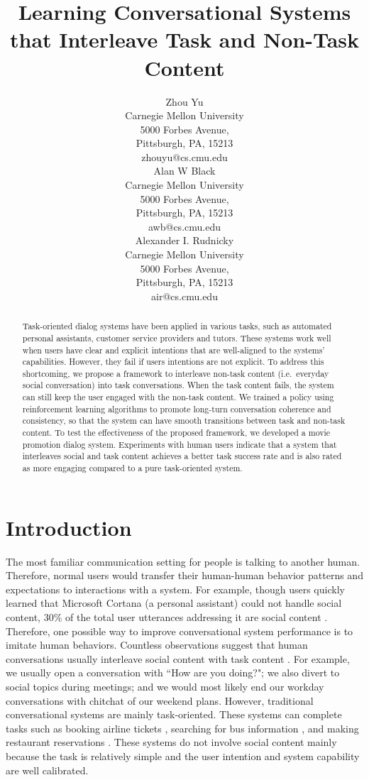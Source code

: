 \documentclass[11pt]{article}
\title{Learning Conversational Systems that Interleave Task and Non-Task Content}
\author{Zhou Yu\\
  Carnegie Mellon University \\
  5000 Forbes Avenue, \\
  Pittsburgh, PA, 15213 \\
  {zhouyu@cs.cmu.edu} \\\And
  Alan W Black\\
  Carnegie Mellon University \\
  5000 Forbes Avenue, \\
  Pittsburgh, PA, 15213 \\
  {awb@cs.cmu.edu} \\\And
  Alexander I. Rudnicky \\
  Carnegie Mellon University \\
  5000 Forbes Avenue, \\
  Pittsburgh, PA, 15213 \\
  {air@cs.cmu.edu} \\}
\date{}
\newcommand{\dk}[1]{{\color{red} #1}}
\begin{document}
\maketitle
\begin{abstract}
Task-oriented dialog systems have been applied in various tasks, such as automated personal assistants, customer service providers and tutors. These systems work well when users have clear and explicit intentions that are well-aligned to the systems' capabilities. However, they fail if users intentions are not explicit.
To address this shortcoming, we propose a framework to interleave non-task content (i.e.~everyday social conversation) into task conversations. When the task content fails, the system can still keep the user engaged with the non-task content. We trained a policy using reinforcement learning algorithms to promote  long-turn conversation coherence and consistency, so that the system can have smooth transitions between task and non-task content.
To test the effectiveness of the proposed framework, we developed a movie promotion dialog system. Experiments with human users indicate that a system that interleaves social and task content achieves a better task success rate and is also rated as more engaging compared to a pure task-oriented system.


\end{abstract}





\section{Introduction}
The most familiar communication setting for people is talking to another human. Therefore, normal users would transfer their human-human behavior patterns and expectations to interactions with a system. For example, though users quickly learned that Microsoft Cortana (a personal assistant) could not handle social content, 30\% of the total user utterances addressing it are social content \cite{jiang2015automatic}. Therefore, one possible way to improve conversational system performance is to imitate human behaviors. Countless observations suggest that human conversations usually interleave social content with task content \cite{schegloff1968sequencing}. For example, we usually open a conversation with ``How are you doing?"; we also divert to social topics during meetings; and we would most likely end our workday conversations with chitchat of our weekend plans. 
However, traditional conversational systems are mainly task-oriented. These systems can complete tasks such as booking airline tickets \cite{zue1994pegasus}, searching for bus information \cite{raux2005let}, and making restaurant reservations \cite{jurcicek2011real}. These systems do not involve social content mainly because the task is relatively simple and the user intention and system capability are well calibrated. 
\end{document}
